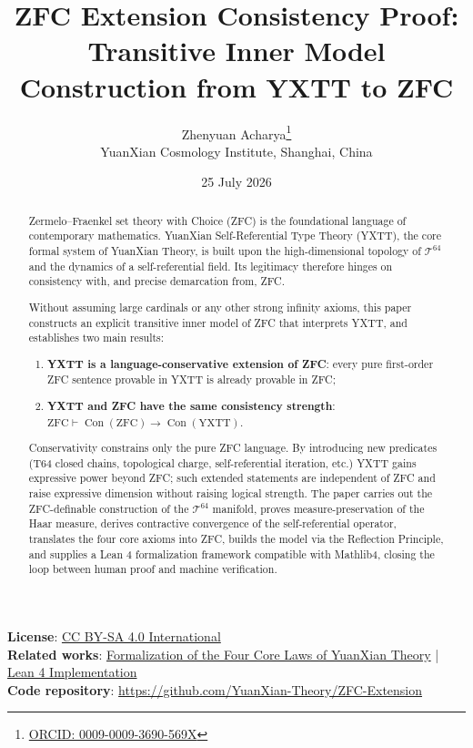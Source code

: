 \documentclass[12pt,a4paper]{article}
\theoremstyle{plain}
\theoremstyle{definition}
\newcommand{\Tsixtyfour}{\mathcal{T}^{64}}
\newcommand{\YXTT}{\mathrm{YXTT}}
\newcommand{\ZFC}{\mathrm{ZFC}}
\newcommand{\Con}{\operatorname{Con}}
\begin{document}
\title{ZFC Extension Consistency Proof:\\ Transitive Inner Model Construction from YXTT to ZFC}
\author{Zhenyuan Acharya\thanks{\href{https://orcid.org/0009-0009-3690-569X}{ORCID: 0009-0009-3690-569X}} \\
YuanXian Cosmology Institute, Shanghai, China}
\date{25 July 2026}

\maketitle

\begin{center}
\footnotesize
\textbf{License}: \href{https://creativecommons.org/licenses/by-sa/4.0/}{CC BY-SA 4.0 International}\\
\textbf{Related works}: \href{https://zenodo.org/record/19657426}{Formalization of the Four Core Laws of YuanXian Theory} | \href{https://zenodo.org/record/19719792}{Lean 4 Implementation}\\
\textbf{Code repository}: \url{https://github.com/YuanXian-Theory/ZFC-Extension}
\end{center}
\vspace{0.5em}

\begin{abstract}
Zermelo--Fraenkel set theory with Choice (ZFC) is the foundational language of contemporary mathematics. YuanXian Self-Referential Type Theory (YXTT), the core formal system of YuanXian Theory, is built upon the high-dimensional topology of $\Tsixtyfour$ and the dynamics of a self-referential field. Its legitimacy therefore hinges on consistency with, and precise demarcation from, ZFC.

Without assuming large cardinals or any other strong infinity axioms, this paper constructs an explicit transitive inner model of ZFC that interprets YXTT, and establishes two main results:
\begin{enumerate}
  \item \textbf{YXTT is a language-conservative extension of ZFC}: every pure first-order ZFC sentence provable in YXTT is already provable in ZFC;
  \item \textbf{YXTT and ZFC have the same consistency strength}: $\ZFC \vdash \Con(\ZFC) \to \Con(\YXTT)$.
\end{enumerate}

Conservativity constrains only the pure ZFC language. By introducing new predicates (T64 closed chains, topological charge, self-referential iteration, etc.) YXTT gains expressive power beyond ZFC; such extended statements are independent of ZFC and raise expressive dimension without raising logical strength. The paper carries out the ZFC-definable construction of the $\Tsixtyfour$ manifold, proves measure-preservation of the Haar measure, derives contractive convergence of the self-referential operator, translates the four core axioms into ZFC, builds the model via the Reflection Principle, and supplies a Lean 4 formalization framework compatible with Mathlib4, closing the loop between human proof and machine verification.
\end{abstract}
\end{document}
